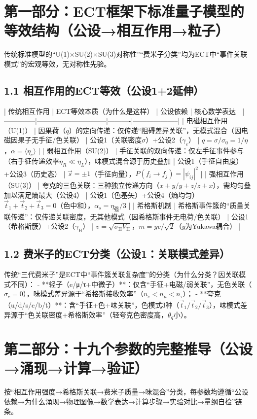 \documentclass{article}
\begin{document}
\section{第一部分：ECT框架下标准量子模型的等效结构（公设→相互作用→粒子）}
传统标准模型的“U(1)×SU(2)×SU(3)对称性”“费米子分类”均为ECT中“事件关联模式”的宏观等效，无对称性先验。

\subsection{1.1 相互作用的ECT等效（公设1+2延伸）}
| 传统相互作用 | ECT等效本质（为什么是这样） | 公设依赖 | 核心数学表达 |
|--------------|------------------------------|----------|--------------------|
| 电磁相互作用（U(1)） | 因果荷（\(q\)）的定向传递：仅传递“阻碍差异关联”，无模式混合（因电磁因果子无手征/色关联） | 公设1（关联密度\(\sigma\)）+公设2（\(\gamma_e\)） | \(q = \sigma/\sigma_0 = 1/\eta\)，\(\alpha = \langle \eta_e \rangle\) |
| 弱相互作用（SU(2)） | 手征关联的双向传递：仅左手征事件参与（右手征传递效率\(\eta_R \ll \eta_L\)），味模式混合源于历史叠加 | 公设1（手征自由度）+公设3（历史态） | \(\vec{s} = \pm1\)（手征向量），\(P(f_i \to f_j) = |\psi_{ij}|^2\) |
| 强相互作用（SU(3)） | 夸克的三色关联：三种独立传递方向（\(x+y/y+z/z+x\)），需均匀叠加以满足熵最大（公设4） | 公设1（色基矢）+公设4（熵均匀） | \(\vec{t}_1+\vec{t}_2+\vec{t}_3 = 0\)（色中和），\(\alpha_s = \eta_{\text{强}}/3\) |
| 希格斯机制 | 希格斯事件簇的“质量关联传递”：仅传递关联密度，无其他模式（因希格斯事件无电荷/色关联） | 公设1（希格斯簇）+公设2（\(\gamma_{\text{H}}\)） | \(v = \sqrt{\sigma_{\text{H}}V_{\text{H}}}\)，\(m = y v/\sqrt{2}\)（\(y\)为Yukawa耦合） |

\subsection{1.2 费米子的ECT分类（公设1：关联模式差异）}
传统“三代费米子”是ECT中“事件簇关联复杂度”的分类（为什么分类？因关联模式不同）：
- **轻子（e/μ/τ+中微子）**：仅含“手征+电磁/弱关联”，无色关联（\(\sigma_c = 0\)），味模式差异源于“希格斯接收效率”（\(n_e < n_\mu < n_\tau\)）；
- **夸克（u/d/s/c/b/t）**：含“手征+色+味关联”，色模式3种（\(\vec{t}_1/\vec{t}_2/\vec{t}_3\)），味模式差异源于“色关联密度+希格斯效率”（轻夸克色密度高，\(\theta_q\)小）。


\section{第二部分：十九个参数的完整推导（公设→涌现→计算→验证）}
按“相互作用强度→希格斯关联→费米子质量→味混合”分类，每参数均遵循“公设依赖→为什么涌现→物理图像→数学表达→计算步骤→实验对比→量纲自检”链条。
\end{document}
